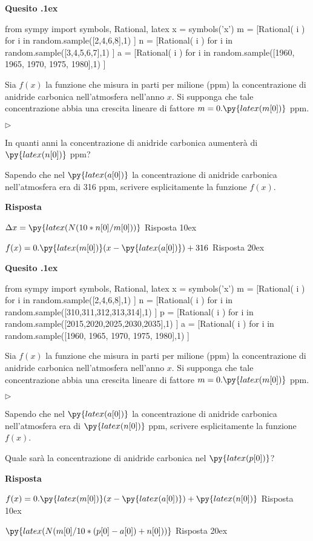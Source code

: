 \documentclass[11pt,twoside,a4paper]{article}
\newcommand{\mylabel}[1]{#1\hfill}
\renewenvironment{itemize}
  {\begin{list}{$\triangleright$}{%
   \setlength{\parskip}{0mm}
   \setlength{\topsep}{.4\baselineskip}
   \setlength{\rightmargin}{0mm}
   \setlength{\listparindent}{0mm}
   \setlength{\itemindent}{0mm}
   \setlength{\labelwidth}{2ex}
   \setlength{\itemsep}{.4\baselineskip}
   \setlength{\parsep}{0mm}
   \setlength{\partopsep}{0mm}
   \setlength{\labelsep}{1ex}
   \setlength{\leftmargin}{\labelwidth+\labelsep}
   \let\makelabel\mylabel}}{%
   \end{list}\vspace*{-1.3mm}}
\newcounter{quesito}
\newenvironment{question}{\bigskip\addtocounter{quesito}{1}\bigskip\bigskip\par\textbf{Quesito \thequesito.\kern1ex}}{\vspace{\parskip}}
\newenvironment{answer}{\par\textbf{Risposta\quad}}{\vspace{\parskip}}
\begin{document}
\begin{question}
\begin{pycode}
from sympy import symbols, Rational, latex
x = symbols('x')
m = [Rational( i ) for i in random.sample([2,4,6,8],1) ]
n = [Rational( i ) for i in random.sample([3,4,5,6,7],1) ]
a = [Rational( i ) for i in random.sample([1960, 1965, 1970, 1975, 1980],1) ]
\end{pycode}
Sia $f(x)$ la funzione che misura in parti per milione (ppm) la concentrazione di anidride carbonica nell'atmosfera nell'anno $x$. Si supponga che tale concentrazione abbia una crescita lineare di fattore $m = 0.\py{latex(m[0])}$ ppm.
\begin{itemize}
\item[1.] In quanti anni la concentrazione di anidride carbonica aumenter\`a di $\py{latex(n[0])}$ ppm?
\item[2.] Sapendo che nel $\py{latex(a[0])}$ la concentrazione di anidride carbonica nell'atmosfera era di 316 ppm, scrivere esplicitamente la funzione $f(x)$.
\end{itemize}
\begin{answer}

{\color{blue}
$\Delta x = \py{latex(N(10*n[0]/m[0]))}$
\hfill Risposta 1\kern0ex}

\smallskip
{\color{blue}
$f(x) = 0.\py{latex(m[0])} ( x - \py{latex(a[0])}) + 316$
\hfill Risposta 2\kern0ex}

\end{answer}
\end{question}
\begin{question}
\begin{pycode}
from sympy import symbols, Rational, latex
x = symbols('x')
m = [Rational( i ) for i in random.sample([2,4,6,8],1) ]
n = [Rational( i ) for i in random.sample([310,311,312,313,314],1) ]
p = [Rational( i ) for i in random.sample([2015,2020,2025,2030,2035],1) ]
a = [Rational( i ) for i in random.sample([1960, 1965, 1970, 1975, 1980],1) ]
\end{pycode}
Sia $f(x)$ la funzione che misura in parti per milione (ppm) la concentrazione di anidride carbonica nell'atmosfera nell'anno $x$. Si supponga che tale concentrazione abbia una crescita lineare di fattore $m = 0.\py{latex(m[0])}$ ppm.
\begin{itemize}
\item[1.] Sapendo che nel $\py{latex(a[0])}$ la concentrazione di anidride carbonica nell'atmosfera era di $\py{latex(n[0])}$ ppm, scrivere esplicitamente la funzione $f(x)$.
\item[2.] Quale sar\`a la concentrazione di anidride carbonica nel $\py{latex(p[0])}$?
\end{itemize}
\begin{answer}

\smallskip
{\color{blue}
$f(x) = 0.\py{latex(m[0])} ( x - \py{latex(a[0])}) + \py{latex(n[0])}$
\hfill Risposta 1\kern0ex}

{\color{blue}
$\py{latex(N(m[0]/10*(p[0]-a[0])+n[0]))}$
\hfill Risposta 2\kern0ex}

\end{answer}
\end{question}
\end{document}
